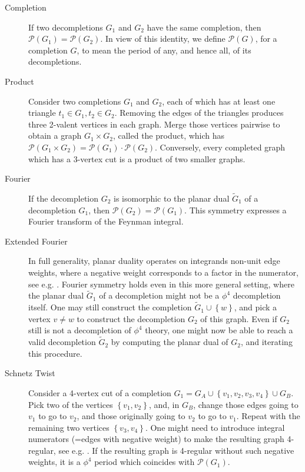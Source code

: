 \documentclass[11pt,a4paper]{article}
\newcommand{\period}{\mathcal P}
\renewcommand{\|}{\rule[-0.4ex]{0.2ex}{1.2em}}
\begin{document}
\begin{description}
	\item[Completion] \cite{schnetz_quantum_2010} If two decompletions $G_1$ and $G_2$ have the same completion, then    $\period(G_1)=\period(G_2)$. In view of this identity, we define $\period(G)$, for a completion $G$, to mean the period of any, and hence all, of its decompletions.
	\item[Product] \cite{schnetz_quantum_2010} Consider two completions $G_1$ and $G_2$, each of which has at least one triangle $t_1\in G_1,t_2\in G_2$. Removing the edges of the triangles produces three 2-valent vertices in each graph. Merge those vertices pairwise to obtain a graph $G_1 \times G_2$, called the product, which has $\period(G_1\times G_2)=\period(G_1) \cdot \period(G_2)$. Conversely, every completed graph which has a 3-vertex cut is a product of two smaller graphs. 
	\item[Fourier] \cite{broadhurst_exploiting_1986} If the decompletion $G_2$ is isomorphic to the planar dual $\tilde G_1$ of a decompletion $G_1$, then $\period(G_2)=\period(G_1)$. This symmetry expresses a Fourier transform of the Feynman integral.
	\item[Extended Fourier]\cite{schnetz_quantum_2010} In full generality,   planar duality operates on integrands non-unit edge weights, where a negative weight corresponds to a factor in the numerator, see e.g. \cite{golz_graphical_2017,borinsky_graphical_2022}.   Fourier symmetry holds even in this more general setting, where the planar dual $\tilde G_1$ of a decompletion might not be  a $\phi^4$ decompletion itself. One may still construct the completion  $\tilde G_1\cup \left \lbrace w \right \rbrace $, and pick a vertex $v\neq w$ to construct the decompletion $G_2$ of this graph. Even if $G_2$ still is not a decompletion of $\phi^4$ theory, one might now be able to reach a valid decompletion $\tilde G_2$ by computing the planar dual of $G_2$, and iterating this procedure. 
	\item[Schnetz Twist]\cite{schnetz_quantum_2010} Consider a 4-vertex cut  of a completion $G_1=G_A \cup \left \lbrace v_1,v_2,v_3,v_4 \right \rbrace \cup G_B$.  Pick two of the vertices $\left \lbrace v_1,v_2 \right \rbrace $, and, in $G_B$, change those edges going to $v_1$ to go to $v_2$, and those originally going to $v_2$ to go to $v_1$. Repeat with the remaining two vertices $\left \lbrace v_3,v_4 \right \rbrace $. One might need to introduce integral numerators (=edges with negative weight) to make the resulting graph 4-regular, see e.g. \cite{borinsky_graphical_2022}. If the resulting graph is 4-regular without such negative weights, it is a $\phi^4$ period which coincides with $\period(G_1)$.

\end{description}
\end{document}
